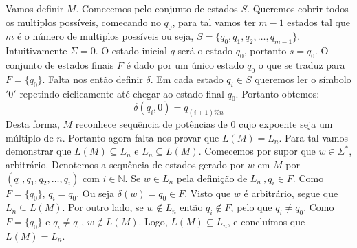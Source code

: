 \documentclass{article}
\begin{document}
Vamos definir $M$. Comecemos pelo conjunto de estados $S$. Queremos cobrir todos os multiplos possíveis, comecando no $q_0$, para tal vamos ter $m - 1$ estados tal que $m$ é o número de multiplos possíveis ou seja, $S = \{q_0,q_1,q_2,\dots , q_{m-1}\}$. Intuitivamente $\Sigma = 0$. O estado inicial $q$ será o estado $q_0$, portanto $s=q_0$. O conjunto de estados finais $F$ é dado por um único estado $q_0$ o que se traduz para $F = \{q_0\}$. Falta nos então definir $\delta$. Em cada estado $q_i \in S$ queremos ler o símbolo $'0'$ repetindo ciclicamente até chegar ao estado final $q_0$. Portanto obtemos:
\[
  \delta(q_i,0) = q_{(i+1) \% n}
\]
Desta forma, $M$ reconhece sequência de potências de $0$ cujo expoente seja um múltiplo de $n$. Portanto agora falta-nos provar que $L(M) = L_n$. Para tal vamos demonstrar que $L(M) \subseteq L_n$ e $L_n \subseteq L(M)$. Comecemos por supor que $w \in \Sigma^\ast$, arbitrário. Denotemos a sequência de estados gerado por $w$ em $M$ por $(q_0,q_1,q_2,\dots , q_{i})$ com $i \in \mathbb{N}$. Se $w \in L_n$ pela definição de $L_n \ , q_i \in F$. Como $F = \{q_0\}$, $q_i = q_0$. Ou seja $\delta(w) = q_0 \in F$. Visto que $w$ é arbitrário, segue que $L_n \subseteq L(M)$. Por outro lado, se $w \notin L_n$ então $q_i \notin F$, pelo que $q_i \neq q_0$. Como $F = \{q_0\}$ e $q_i \neq q_0$, $w \notin L(M)$. Logo, $L(M) \subseteq L_n$, e concluímos que $L(M) = L_n$.
\end{document}
